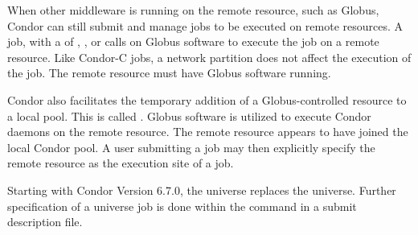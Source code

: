 When other middleware is running on the remote resource,
such as Globus,
Condor can still submit and manage jobs to be executed on
remote resources.
A   job,
with a  of
, , or 
calls on Globus software to execute the job on a remote resource.
Like Condor-C jobs, a network partition does not affect
the execution of the job.
The remote resource must have Globus software running.

Condor also facilitates the temporary addition of a
Globus-controlled resource to a local pool.
This is called .
Globus software is utilized to execute Condor daemons on the
remote resource.
The remote resource appears to have joined the local Condor pool.
A user submitting a job may then explicitly specify the
remote resource as the execution site of a job.

Starting with Condor Version 6.7.0, the  universe
replaces the  universe.
Further specification of a  universe job is done
within the  command in a submit description file.
